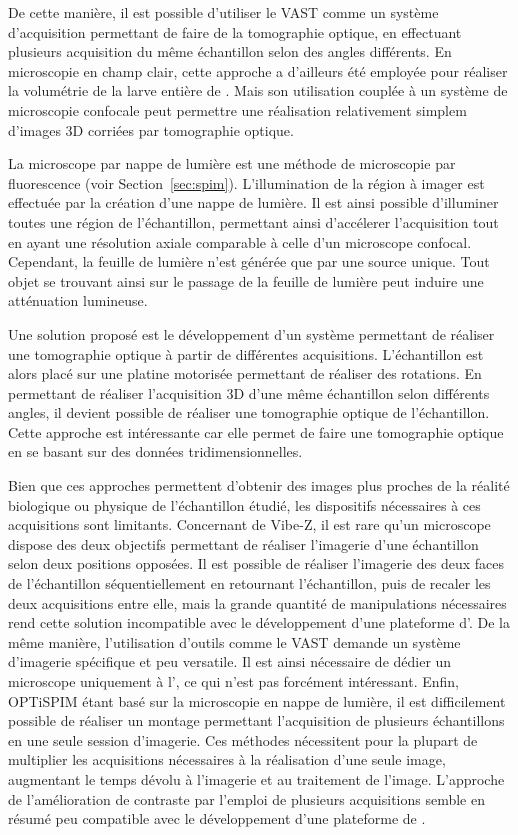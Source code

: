 \documentclass[\main/main.tex]{subfiles}
\begin{document}
%
De cette manière, il est possible d'utiliser le VAST comme un système d'acquisition permettant de faire de la tomographie optique\cite{pardomartin_2013}, en effectuant plusieurs acquisition du même échantillon selon des angles différents.
%
En microscopie en champ clair,
cette approche a d'ailleurs été employée pour réaliser la volumétrie de la larve entière de \pz\cite{guo_2017}.
%
Mais son utilisation couplée à un système de microscopie confocale peut permettre une réalisation relativement simplem d'images 3D corriées par tomographie optique.

%
La microscope par nappe de lumière est une méthode de microscopie par fluorescence\cite{huisken_2004} (voir Section~\ref{sec:spim}).
%
L'illumination de la région à imager est effectuée par la création d'une nappe de lumière.
%
Il est ainsi possible d'illuminer toutes une région de l'échantillon, permettant ainsi d'accélerer l'acquisition tout en ayant une résolution axiale comparable à celle d'un microscope confocal.
%
Cependant, la feuille de lumière n'est générée que par une source unique.
%
Tout objet se trouvant ainsi sur le passage de la feuille de lumière peut induire une atténuation lumineuse.

%
Une solution proposé est le développement d'un système permettant de réaliser une tomographie optique à partir de différentes acquisitions\cite{Mayer_2018}.
%
L'échantillon est alors placé sur une platine motorisée permettant de réaliser des rotations.
%
En permettant de réaliser l'acquisition 3D d'une même échantillon selon différents angles, il devient possible de réaliser une tomographie optique de l'échantillon.
%
Cette approche est intéressante car elle permet de faire une tomographie optique en se basant sur des données tridimensionnelles.

%
Bien que ces approches permettent d'obtenir des images plus proches de la réalité biologique ou physique de l'échantillon étudié, les dispositifs nécessaires à ces acquisitions sont limitants.
%
Concernant de Vibe-Z, il est rare qu'un microscope dispose des deux objectifs permettant de réaliser l'imagerie d'une échantillon selon deux positions opposées.
%
Il est possible de réaliser l'imagerie des deux faces de l'échantillon séquentiellement en retournant l'échantillon, puis de recaler les deux acquisitions entre elle, mais la grande quantité de manipulations nécessaires rend cette solution incompatible avec le développement d'une plateforme d'\hti{}.
%
De la même manière, l'utilisation d'outils comme le VAST demande un système d'imagerie spécifique et peu versatile. Il est ainsi nécessaire de dédier un microscope uniquement à l'\hti{}, ce qui n'est pas forcément intéressant.
%
Enfin, OPTiSPIM étant basé sur la microscopie en nappe de lumière, il est difficilement possible de réaliser un montage permettant l'acquisition de plusieurs échantillons en une seule session d'imagerie.
%
Ces méthodes nécessitent pour la plupart de multiplier les acquisitions nécessaires à la réalisation d'une seule image, augmentant le temps dévolu à l'imagerie et au traitement de l'image.
%
L'approche de l'amélioration de contraste par l'emploi de plusieurs acquisitions semble en résumé peu compatible avec le développement d'une plateforme de \hcs{}.
\end{document}
